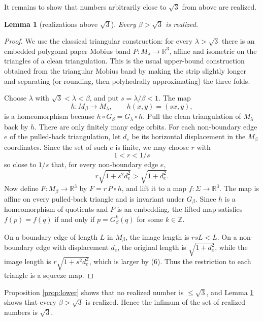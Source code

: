 \documentclass[12pt]{article}
\newtheorem{lemma}{Lemma}
\newcommand{\R}{\mathbb R}
\newcommand{\Z}{\mathbb Z}
\begin{document}
It remains to show that numbers arbitrarily close to \(\sqrt3\) from
above are realized.

\begin{lemma}[realizations above \(\sqrt3\)]\label{lem:upper}
Every \(\beta>\sqrt3\) is realized.
\end{lemma}

\begin{proof}
We use the classical triangular construction: for every
\(\lambda>\sqrt3\) there is an embedded polygonal paper Mobius band
\(P:M_\lambda\to\R^3\), affine and isometric on the triangles of a clean
triangulation.  This is the usual upper-bound construction obtained from
the triangular Mobius band by making the strip slightly longer and
separating (or rounding, then polyhedrally approximating) the three
folds.

Choose \(\lambda\) with \(\sqrt3<\lambda<\beta\), and put
\(s=\lambda/\beta<1\).  The map
\[
        h:M_\beta\longrightarrow M_\lambda,\qquad h(x,y)=(sx,y),
\]
is a homeomorphism because \(h\circ G_\beta=G_\lambda\circ h\).
Pull the clean triangulation of \(M_\lambda\) back by \(h\).  There are
only finitely many edge orbits.  For each non-boundary edge \(e\) of the
pulled-back triangulation, let \(d_e\) be its horizontal displacement in
the \(M_\beta\) coordinates.  Since the set of such \(e\) is finite, we
may choose \(r\) with
\[
        1<r<1/s
\]
so close to \(1/s\) that, for every non-boundary edge \(e\),
\[
        r\sqrt{1+s^2d_e^2}>\sqrt{1+d_e^2}.                    \tag{6}
\]
Now define \(F:M_\beta\to\R^3\) by \(F=r\,P\circ h\), and lift it to a
map \(f:\Sigma\to\R^3\).  The map is affine on every pulled-back triangle
and is invariant under \(G_\beta\).  Since \(h\) is a homeomorphism of
quotients and \(P\) is an embedding, the lifted map satisfies
\(f(p)=f(q)\) if and only if \(p=G_\beta^k(q)\) for some \(k\in\Z\).

On a boundary edge of length \(L\) in \(M_\beta\), the image length is
\(rsL<L\).  On a non-boundary edge with displacement \(d_e\), the original
length is \(\sqrt{1+d_e^2}\), while the image length is
\(r\sqrt{1+s^2d_e^2}\), which is larger by (6).  Thus the restriction to
each triangle is a squeeze map.
\end{proof}

Proposition \ref{prop:lower} shows that no realized number is
\(\le\sqrt3\), and Lemma \ref{lem:upper} shows that every
\(\beta>\sqrt3\) is realized.  Hence the infimum of the set of realized
numbers is \(\sqrt3\).
\end{document}
